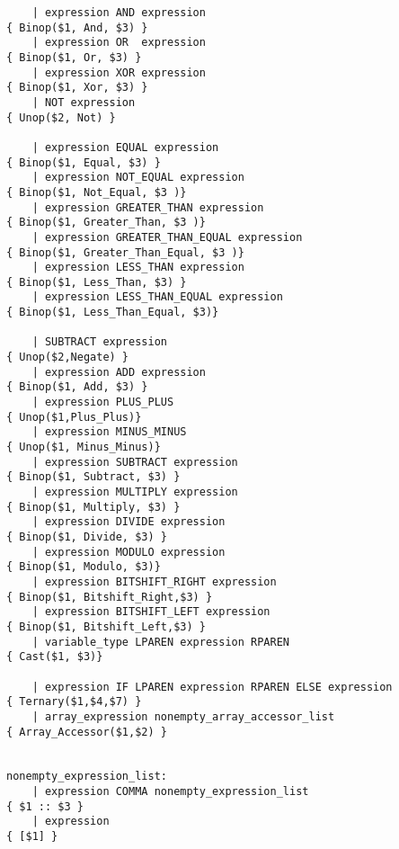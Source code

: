 \begin{verbatim}
    | expression AND expression                                         { Binop($1, And, $3) }
    | expression OR  expression                                         { Binop($1, Or, $3) }
    | expression XOR expression                                         { Binop($1, Xor, $3) }
    | NOT expression                                                    { Unop($2, Not) }

    | expression EQUAL expression                                       { Binop($1, Equal, $3) }
    | expression NOT_EQUAL expression                                   { Binop($1, Not_Equal, $3 )}
    | expression GREATER_THAN expression                                { Binop($1, Greater_Than, $3 )}
    | expression GREATER_THAN_EQUAL expression                          { Binop($1, Greater_Than_Equal, $3 )}
    | expression LESS_THAN expression                                   { Binop($1, Less_Than, $3) }
    | expression LESS_THAN_EQUAL expression                             { Binop($1, Less_Than_Equal, $3)}

    | SUBTRACT expression                                               { Unop($2,Negate) }
    | expression ADD expression                                         { Binop($1, Add, $3) }
    | expression PLUS_PLUS                                              { Unop($1,Plus_Plus)}
    | expression MINUS_MINUS                                            { Unop($1, Minus_Minus)}
    | expression SUBTRACT expression                                    { Binop($1, Subtract, $3) }
    | expression MULTIPLY expression                                    { Binop($1, Multiply, $3) }
    | expression DIVIDE expression                                      { Binop($1, Divide, $3) }
    | expression MODULO expression                                      { Binop($1, Modulo, $3)}
    | expression BITSHIFT_RIGHT expression                              { Binop($1, Bitshift_Right,$3) }
    | expression BITSHIFT_LEFT expression                               { Binop($1, Bitshift_Left,$3) }
    | variable_type LPAREN expression RPAREN                            { Cast($1, $3)}

    | expression IF LPAREN expression RPAREN ELSE expression            { Ternary($1,$4,$7) }
    | array_expression nonempty_array_accessor_list                     { Array_Accessor($1,$2) }


nonempty_expression_list:
    | expression COMMA nonempty_expression_list                         { $1 :: $3 }
    | expression                                                        { [$1] }


\end{verbatim}
